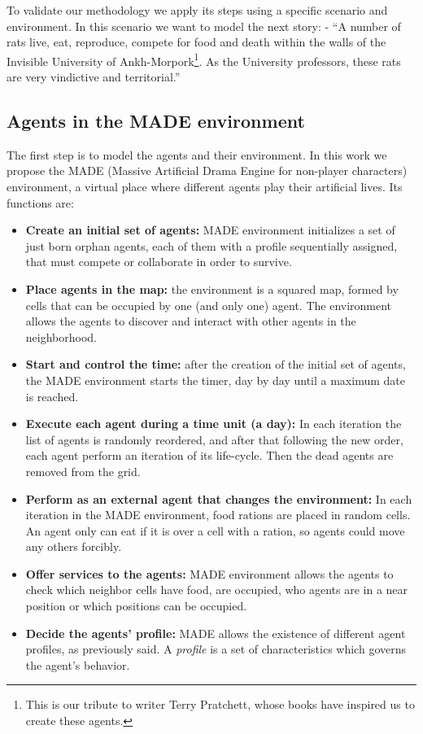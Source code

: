 \documentclass[letterpaper]{article}
\begin{document}
To validate our methodology we apply its steps using a specific scenario and environment. In this scenario we want to model the next story: %
 - ``A number of rats live, eat, reproduce, compete for food and death within the walls of the Invisible University of Ankh-Morpork\footnote{This is our tribute to writer Terry Pratchett, whose books have inspired us to create these agents.}. As the University professors, these rats are very vindictive and territorial.''

\subsection{Agents in the MADE environment}

The first step is to model the agents and their environment. In this work we propose the MADE (Massive Artificial Drama Engine for non-player characters) environment, a virtual place where different agents play their artificial lives. Its functions are:

\begin{itemize}
\item \textbf{Create an initial set of agents:} MADE environment
  initializes a set of just born orphan agents, each of them with a profile
  sequentially assigned, that must compete or collaborate in order to survive.
\item \textbf{Place agents in the map:} the environment is a squared map, formed by cells that can be occupied by one (and only one) agent. The environment allows the agents to discover and interact with other agents in the neighborhood.
\item \textbf{Start and control the time:} after the creation of the initial set of agents, the MADE environment starts the timer, day by day until a maximum date is reached.
\item \textbf{Execute each agent during a time unit (a day):} In each iteration the list of agents is randomly reordered, and after that following the new order, each agent perform an iteration of its life-cycle. Then the dead agents are removed from the grid.
\item \textbf{Perform as an external agent that changes the environment:} In each iteration in the MADE environment, food rations are placed in random cells. An agent only can eat if it is over a cell with a ration, so agents could move any others forcibly.
\item \textbf{Offer services to the agents:} MADE environment allows the agents to check which neighbor cells have food, are occupied, who agents are in a near position or which positions can be occupied.
\item \textbf{Decide the agents' profile:} MADE allows the existence of different agent profiles, as previously said. A {\em profile} is a set of characteristics which governs the agent's behavior.
\end{itemize}
\end{document}
